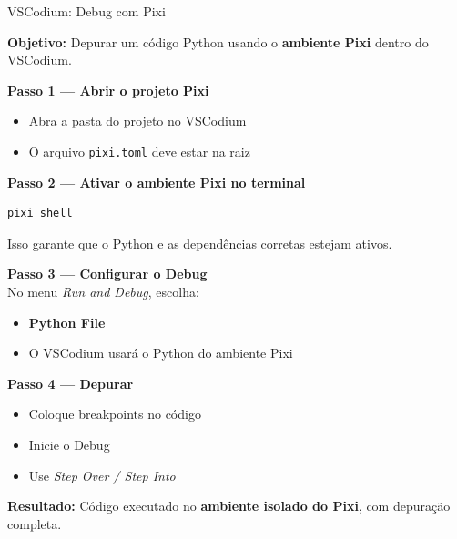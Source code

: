 \documentclass{beamer}
\begin{document}
\begin{frame}[fragile]{VSCodium: Debug com Pixi}
    
    \textbf{Objetivo:}  
    Depurar um código Python usando o \textbf{ambiente Pixi} dentro do VSCodium.
    
    \vspace{0.3cm}
    
    \textbf{Passo 1 — Abrir o projeto Pixi}
    \begin{itemize}
        \item Abra a pasta do projeto no VSCodium
        \item O arquivo \texttt{pixi.toml} deve estar na raiz
    \end{itemize}
    
    \vspace{0.3cm}
    
    \textbf{Passo 2 — Ativar o ambiente Pixi no terminal}
    \begin{verbatim}
pixi shell
    \end{verbatim}
    
    Isso garante que o Python e as dependências corretas estejam ativos.
    
    \vspace{0.3cm}
    
    \textbf{Passo 3 — Configurar o Debug}\\
    No menu \textit{Run and Debug}, escolha:
    \begin{itemize}
        \item \textbf{Python File}
        \item O VSCodium usará o Python do ambiente Pixi
    \end{itemize}
    
    \vspace{0.3cm}
    
    \textbf{Passo 4 — Depurar}
    \begin{itemize}
        \item Coloque breakpoints no código
        \item Inicie o Debug
        \item Use \textit{Step Over / Step Into}
    \end{itemize}
    
    \vspace{0.3cm}
    
    \textbf{Resultado:}  
    Código executado no \textbf{ambiente isolado do Pixi}, com depuração completa.
    
\end{frame}







%   


%   

\end{document}
